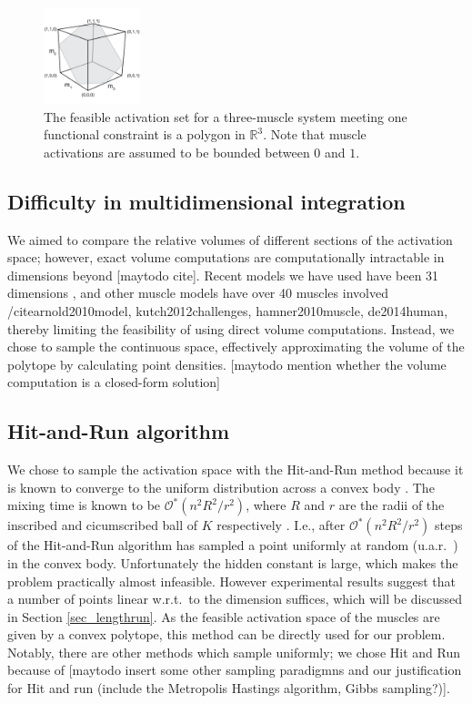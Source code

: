 \begin{figure}[ht]
  \label{fig:fig_hr}
   \begin{center}
    \includegraphics[width=0.25\textwidth]{sections/figs/feasibleactivation.png}
  \end{center}
  \caption{The feasible activation set for a  three-muscle system meeting one functional constraint is a polygon in $\mathbb{R}^3$. Note that muscle activations are assumed to be bounded between $0$ and $1$.}

\end{figure}

\subsection{Difficulty in multidimensional integration}
We aimed to compare the relative volumes of different sections of the activation space; however, exact volume computations are computationally intractable in dimensions beyond [maytodo cite]. Recent models we have used have been 31 dimensions \cite{Valero-Cuevas2015high-dimensional}, and other muscle models have over 40 muscles involved /cite{arnold2010model, kutch2012challenges, hamner2010muscle, de2014human}, thereby limiting the feasibility of using direct volume computations. Instead, we chose to sample the continuous space, effectively approximating the volume of the polytope by calculating point densities. [maytodo mention whether the volume computation is a closed-form solution]

\subsection{Hit-and-Run algorithm}
We chose to sample the activation space with the Hit-and-Run method because it is known to converge to the uniform distribution across a convex body \cite{smith1984efficient}. The mixing time is known to be $\mathcal{O}^*(n^2R^2/r^2)$, where $R$ and $r$ are the radii of the inscribed and cicumscribed ball of $K$ respectively \cite{Dyer, Lovasz}. I.e., after $\mathcal{O}^*(n^2R^2/r^2)$ steps of the Hit-and-Run algorithm has sampled a point uniformly at random (u.a.r.\ ) in the convex body. Unfortunately the hidden constant is large, which makes the problem practically almost infeasible. However experimental results suggest that a number of points linear w.r.t.\ to the dimension suffices, which will be discussed in Section \ref{sec_lengthrun}. 
As the feasible activation space of the muscles are given by a convex polytope, this method can be directly used for our problem. Notably, there are other methods which sample uniformly; we chose Hit and Run because of [maytodo insert some other sampling paradigmns and our justification for Hit and run (include the Metropolis Hastings algorithm, Gibbs sampling?)].

